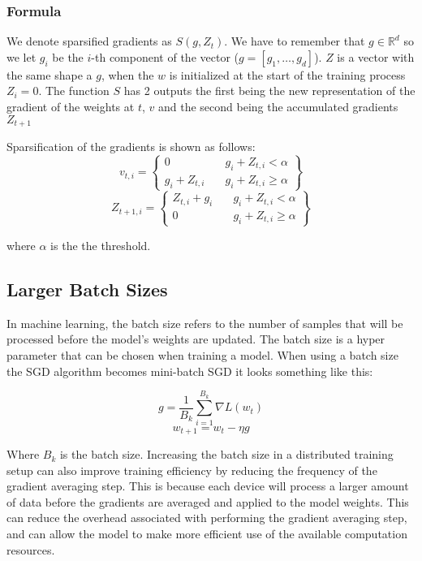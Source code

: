 \documentclass[11pt]{article}
\begin{document}
\subsubsection{Formula}
We denote sparsified gradients as $S(g, Z_t)$. We have to remember that $g \in \mathbb{R}^d$ so we let $g_i$ be the $i$-th component of the vector ($g=[g_1,\ldots,g_d]$). $Z$ is a vector with the same shape a $g$, when the $w$ is initialized at the start of the training process $Z_i = 0$. The function $S$ has 2 outputs the first being the new representation of the gradient of the weights at $t$, $v$ and the second being the accumulated gradients $Z_{t+1}$ 

Sparsification of the gradients is shown as follows: 
$$
v_{t,i} =
\left\{
	\begin{array}{cc}
		0 & \quad g_i + Z_{t,i}<\alpha \\
		g_i + Z_{t,i}	& \quad g_i + Z_{t,i} \geq \alpha
	\end{array}
\right\}
$$
$$
Z_{t+1,i} =
\left\{
	\begin{array}{cc}
		Z_{t,i} + g_i & \quad g_i + Z_{t,i}<\alpha \\
		0	& \quad g_i + Z_{t,i} \geq \alpha
	\end{array}
\right\}
$$

where $\alpha$ is the the threshold.


\subsection{Larger Batch Sizes}
In machine learning, the batch size refers to the number of samples that will be processed before the model's weights are updated. The batch size is a hyper parameter that can be chosen when training a model. When using a batch size the SGD algorithm becomes mini-batch SGD it looks something like this:

$$
g = \frac{1}{B_k} \sum_{i=1}^{B_k} {\nabla} L(w_t)
$$
$$
w_{t+1} = w_t - \eta g
$$ 


Where $B_k$ is the batch size. Increasing the batch size in a distributed training setup can also improve training efficiency by reducing the frequency of the gradient averaging step. This is because each device will process a larger amount of data before the gradients are averaged and applied to the model weights. This can reduce the overhead associated with performing the gradient averaging step, and can allow the model to make more efficient use of the available computation resources.
\end{document}
